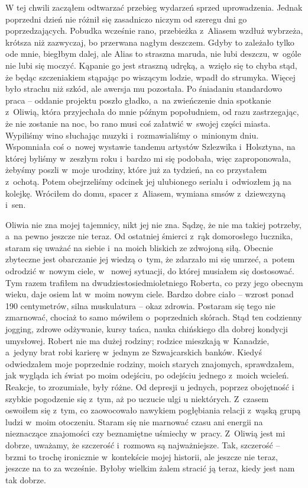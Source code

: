 W tej chwili zacząłem odtwarzać przebieg wydarzeń sprzed uprowadzenia. Jednak poprzedni dzień nie różnił się 
zasadniczo niczym od szeregu dni go poprzedzających. Pobudka wcześnie rano, przebieżka z~Aliasem wzdłuż wybrzeża, 
krótsza niż zazwyczaj, bo przerwana nagłym deszczem. Gdyby to zależało tylko ode mnie, biegłbym dalej, ale Alias to 
straszna maruda, nie lubi deszczu, w~ogóle nie lubi się moczyć. Kąpanie go jest straszną udręką, a~wzięło się to 
chyba stąd, że będąc szczeniakiem stąpając po wiszącym lodzie, wpadł do strumyka. Więcej było strachu niż szkód, ale 
awersja mu pozostała. Po śniadaniu standardowo praca -- oddanie projektu poszło gładko, a~na zwieńczenie dnia 
spotkanie z~Oliwią, która przyjechała do mnie późnym popołudniem, od razu zastrzegając, że nie zostanie na noc, bo 
rano musi coś załatwić w~swojej części miasta. Wypiliśmy wino słuchając muzyki i~rozmawialiśmy o~minionym dniu. 
Wspomniała coś o~nowej wystawie tandemu artystów Szlezwika i~Holsztyna, na której byliśmy w~zeszłym roku i~bardzo mi 
się podobała, więc zaproponowała, żebyśmy poszli w~moje urodziny, które już za tydzień, na co przystałem z~ochotą. 
Potem obejrzeliśmy odcinek jej ulubionego serialu i~odwiozłem ją na kolejkę. Wróciłem do domu, spacer z~Aliasem, 
wymiana smsów z~dziewczyną i~sen.

Oliwia nie zna mojej tajemnicy, nikt jej nie zna. Sądzę, że nie ma takiej potrzeby, a~na pewno jeszcze nie teraz. Od 
ostatniej śmierci z~rąk domorosłego łucznika, staram się uważać na siebie i~na moich bliskich ze zdwojoną siłą. 
Obecnie zbyteczne jest obarczanie jej wiedzą o~tym, że zdarzało mi się umrzeć, a~potem odrodzić w~nowym ciele, w~
nowej sytuacji, do której musiałem się dostosować. Tym razem trafiłem na dwudziestosiedmioletniego Roberta, co przy 
jego obecnym wieku, daje osiem lat w~moim nowym ciele. Bardzo dobre ciało -- wzrost ponad 190 centymetrów, silna 
muskulatura -- okaz zdrowia. Postaram się tego nie zmarnować, chociaż to samo mówiłem o~poprzednich skórach. Stąd ten 
codzienny jogging, zdrowe odżywanie, kursy tańca, nauka chińskiego dla dobrej kondycji umysłowej. Robert nie ma dużej 
rodziny; rodzice mieszkają w~Kanadzie, a~jedyny brat robi karierę w~jednym ze Szwajcarskich banków. Kiedyś 
odwiedzałem moje poprzednie rodziny, moich starych znajomych, sprawdzałem, jak wygląda ich świat po moim odejściu, po 
odejściu jednego z~moich wcieleń. Reakcje, to zrozumiałe, były różne. Od depresji u jednych, poprzez obojętność i~
szybkie pogodzenie się z~tym, aż po uczucie ulgi u niektórych. Z~czasem oswoiłem się z~tym, co zaowocowało nawykiem 
pogłębiania relacji z~wąską grupą ludzi w~moim otoczeniu. Staram się nie marnować czasu ani energii na nieznaczące 
znajomości czy beznamiętne uśmiechy w~pracy. Z~Oliwią jest mi dobrze, uważamy, że szczerość i~rozmowa są 
najważniejsze. Tak, szczerość -- brzmi to trochę ironicznie w~kontekście mojej historii, ale jeszcze nie teraz, 
jeszcze na to za wcześnie. Byłoby wielkim żalem stracić ją teraz, kiedy jest nam tak dobrze.

